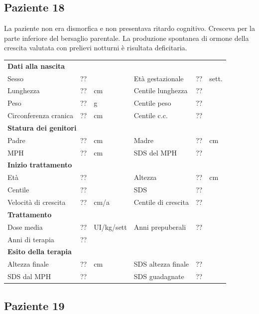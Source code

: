 \subsection*{Paziente 18}%

La paziente non era dismorfica e non presentava ritardo cognitivo. Cresceva per la parte inferiore del bersaglio parentale. La produzione spontanea di ormone della crescita valutata con prelievi notturni è risultata deficitaria.

\begin{table}[!h]
\begin{tabular}{lrllrl}
\toprule
\multicolumn{6}{l}{\textbf{Dati alla nascita}}\\
Sesso 		& \multicolumn{2}{l}{??} 	& Età gestazionale 		& ?? 		& sett.\\
Lunghezza 	& ?? 		& cm 				& Centile lunghezza		& ?? 		\\
Peso 		& ?? 		& g					& Centile peso			& ?? 		\\
Circonferenza cranica	& ?? 		& cm 	& Centile c.c.			& ?? \\
\midrule
\multicolumn{6}{l}{\textbf{Statura dei genitori}}\\
Padre 		& ?? & cm 	& Madre 				& ?? & cm \\
MPH 		& ?? & cm 	& SDS del MPH 			& ??\\
\midrule
\multicolumn{6}{l}{\textbf{Inizio trattamento}} \\
Età	& ?? & 		& Altezza 				& ?? & cm  \\
Centile & ?? 	 &		& SDS		& ?? \\
Velocità di crescita & ?? & cm/a	& Centile di crescita & ??\\
\midrule
\multicolumn{6}{l}{\textbf{Trattamento}} \\
Dose media		& ?? & UI/kg/sett & Anni prepuberali & ??\\
Anni di terapia & ??\\
\midrule
\multicolumn{6}{l}{\textbf{Esito della terapia}} \\
Altezza finale			& ?? & cm 	& SDS altezza finale		& ??\\
SDS dal MPH				& ?? &		& SDS guadagnate 			& ??\\
\bottomrule
\end{tabular}
\end{table}
\clearpage


\subsection*{Paziente 19}%

